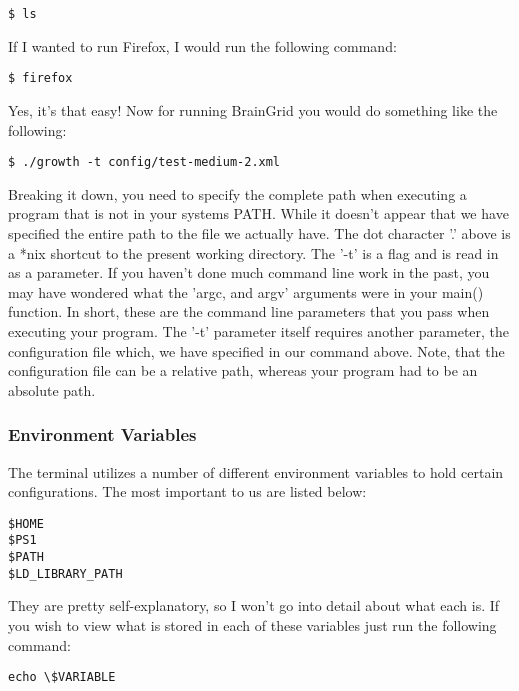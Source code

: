 \begin{lstlisting}
$ ls
\end{lstlisting}

\mdseries \noindent If I wanted to run Firefox, I would run the following command:
	
\begin{lstlisting}
$ firefox
\end{lstlisting}
	
\mdseries \noindent Yes, it's that easy!  Now for running BrainGrid you would do something like the following:

\begin{lstlisting}
$ ./growth -t config/test-medium-2.xml
\end{lstlisting}
	
\mdseries \noindent Breaking it down, you need to specify the complete path when executing a program that is not in your systems PATH.  While it doesn't appear that we have specified the entire path to the file we actually have.  The dot character '.' above is a *nix shortcut to the present working directory.  The '-t' is a flag and is read in as a parameter.  If you haven't done much command line work in the past, you may have wondered what the 'argc, and argv' arguments were in your main() function.  In short, these are the command line parameters that you pass when executing your program.  The '-t' parameter itself requires another parameter, the configuration file which, we have specified in our command above.  Note, that the configuration file can be a relative path, whereas your program had to be an absolute path.


\subsubsection{Environment Variables} \mdseries 
\mdseries \noindent The terminal utilizes a number of different environment variables to hold certain configurations.  The most important to us are listed below:
\begin{lstlisting}
$HOME
$PS1
$PATH
$LD_LIBRARY_PATH
\end{lstlisting}
	
\mdseries \noindent They are pretty self-explanatory, so I won't go into detail about what each is.  If you wish to view what is stored in each of these variables just run the following command:

\begin{lstlisting}
echo \$VARIABLE
\end{lstlisting}
	
